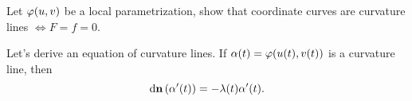 \begin{exercise}
    Let \(\varphi(u,v)\) be a local parametrization, show that coordinate curves are
    curvature lines \(\iff F=f=0\).
\end{exercise}
\begin{comment}
\begin{proof}
    1. If \(\vphi(u,v_0)\) and \(\vphi(u_0,v)\) are curvature lines, \[
        \begin{cases}
            \dd{\vb{n}}(\vphi_u)=-\lambda\vphi_u \\
            \dd{\vb{n}}(\vphi_v)=-\mu\vphi_v
        \end{cases}
        \text{\ie}\quad\begin{cases}
            \vb{n}_u=-\lambda\vphi_u \\
            \vb{n}_v=-\mu\vphi_v
        \end{cases}
    .\] 
    So \(f=-\lambda F=-\mu F\). \ie\ \((\lambda-\mu)F=0\). If \(\lambda=\mu\),
    then the point is umbilical, it's enough to imply \(F=0\).
    If \(\lambda\neq \mu\), then \(F=0\implies f=0\).
\end{proof}
\end{comment}

Let's derive an equation of curvature lines.
If \(\alpha(t)=\varphi(u(t),v(t))\) is a curvature line, then \[
    \dd{\vb{n}}(\alpha'(t))=-\lambda(t)\alpha'(t)
.\] 



\newpage
